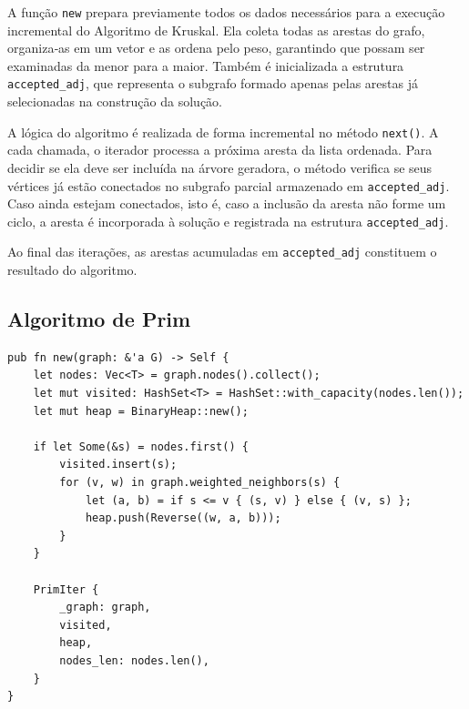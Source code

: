 A função \texttt{new} prepara previamente todos os dados necessários
para a execução incremental do Algoritmo de Kruskal. Ela coleta todas
as arestas do grafo, organiza‑as em um vetor e as ordena pelo peso,
garantindo que possam ser examinadas da menor para a maior. Também é
inicializada a estrutura \texttt{accepted\_adj}, que representa o
subgrafo formado apenas pelas arestas já selecionadas na construção da solução.

A lógica do algoritmo é realizada de forma incremental no método
\texttt{next()}. A cada chamada, o iterador processa a próxima aresta
da lista ordenada. Para decidir se ela deve ser incluída na árvore
geradora, o método verifica se seus vértices já estão conectados no
subgrafo parcial armazenado em \texttt{accepted\_adj}. Caso ainda
estejam conectados, isto é, caso a inclusão da aresta não forme um
ciclo, a aresta é incorporada à solução e registrada na estrutura
\texttt{accepted\_adj}.

Ao final das iterações, as arestas acumuladas em
\texttt{accepted\_adj} constituem o resultado do algoritmo.

\subsection{Algoritmo de Prim}

\begin{listing}[H]
  \caption{Construtor do Iterador de Prim}
\begin{verbatim}
pub fn new(graph: &'a G) -> Self {
    let nodes: Vec<T> = graph.nodes().collect();
    let mut visited: HashSet<T> = HashSet::with_capacity(nodes.len());
    let mut heap = BinaryHeap::new();

    if let Some(&s) = nodes.first() {
        visited.insert(s);
        for (v, w) in graph.weighted_neighbors(s) {
            let (a, b) = if s <= v { (s, v) } else { (v, s) };
            heap.push(Reverse((w, a, b)));
        }
    }

    PrimIter {
        _graph: graph,
        visited,
        heap,
        nodes_len: nodes.len(),
    }
}
\end{verbatim}
\end{listing}

